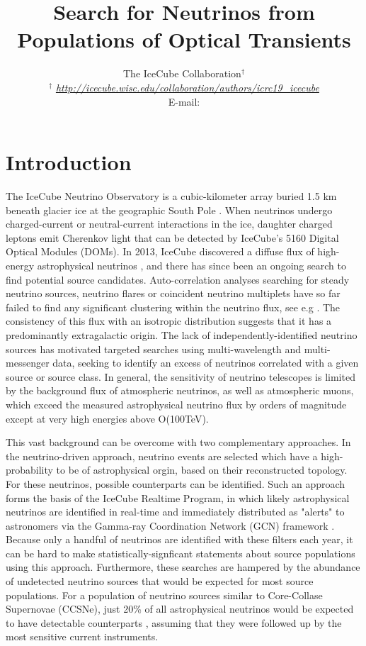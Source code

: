 \documentclass{PoS}
\title{Search for Neutrinos from Populations of Optical Transients}
\author{
The IceCube Collaboration$^{\dagger}$\\
{$^{\dagger}$ \itshape \href{http://icecube.wisc.edu/collaboration/authors/icrc19_icecube}{http://icecube.wisc.edu/collaboration/authors/icrc19\_icecube}}\\
E-mail: \email{robert.stein@desy.de}
}
\begin{document}
	
\section{Introduction}

The IceCube Neutrino Observatory is a cubic-kilometer array buried 1.5 km beneath glacier ice at the geographic South Pole \cite{Aartsen:2016nxy}. When neutrinos undergo charged-current  or neutral-current interactions in the ice, daughter charged leptons emit Cherenkov light that can be detected by IceCube's 5160 Digital Optical Modules (DOMs). In 2013, IceCube discovered a diffuse flux of high-energy astrophysical neutrinos \cite{Aartsen:2013jdh}, and there has since been an ongoing search to find potential source candidates. Auto-correlation analyses searching for steady neutrino sources, neutrino flares or coincident neutrino multiplets have so far failed to find any significant clustering within the neutrino flux, see e.g  \cite{Aartsen:2016oji}. The consistency of this flux with an isotropic distribution suggests that it has a predominantly extragalactic origin. The lack of independently-identified neutrino sources has motivated targeted searches using multi-wavelength and multi-messenger data, seeking to identify an excess of neutrinos correlated with a given source or source class. In general, the sensitivity of neutrino telescopes is limited by the background flux of atmospheric neutrinos, as well as atmospheric muons, which exceed the measured astrophysical neutrino flux by orders of magnitude except at very high energies above O(100TeV). 

This vast background can be overcome with two complementary approaches. In the neutrino-driven approach, neutrino events are selected which have a high-probability to be of astrophysical orgin, based on their reconstructed topology. For these neutrinos, possible counterparts can be identified. Such an approach forms the basis of the IceCube Realtime Program, in which likely astrophysical neutrinos are identified in real-time and immediately distributed as "alerts" to astronomers via the Gamma-ray Coordination Network (GCN) framework \cite{Aartsen:2016lmt}. Because only a handful of neutrinos are identified with these filters each year, it can be hard to make statistically-signficant statements about source populations using this approach. Furthermore, these searches are hampered by the abundance of undetected neutrino sources that would be expected for most source populations. For a population of neutrino sources similar to Core-Collase Supernovae (CCSNe), just 20\% of all astrophysical neutrinos would be expected to have detectable counterparts \cite{Kankare:2019bzi}, assuming that they were followed up by the most sensitive current instruments.
\end{document}
